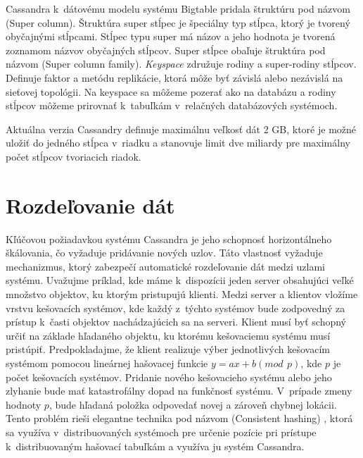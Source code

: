 \documentclass[11pt,twoside,a4paper]{book}
\begin{document}
Cassandra k~dátovému modelu systému Bigtable pridala štruktúru pod názvom \emph{} (Super column). Štruktúra super stĺpec je špeciálny typ stĺpca, ktorý je tvorený obyčajnými stĺpcami. Stĺpec typu super má názov a jeho hodnota je tvorená zoznamom názvov obyčajných stĺpcov. Super stĺpce obaľuje štruktúra pod názvom \emph{} (Super column family). \emph{Keyspace} združuje rodiny a super-rodiny stĺpcov. Definuje faktor a metódu replikácie, ktorá môže byť závislá alebo nezávislá na sieťovej topológii. Na keyspace sa môžeme pozerať ako na databázu a rodiny stĺpcov môžeme prirovnať k~tabuľkám v~relačných databázových systémoch.

Aktuálna verzia Cassandry definuje maximálnu veľkosť dát 2 GB, ktoré je možné uložiť do jedného stĺpca v~riadku a stanovuje limit dve miliardy pre maximálny počet stĺpcov tvoriacich riadok.



\section{Rozdeľovanie dát}
Kľúčovou požiadavkou systému Cassandra je jeho schopnosť horizontálneho škálovania, čo vyžaduje pridávanie nových uzlov. Táto vlastnosť vyžaduje mechanizmus, ktorý zabezpečí automatické rozdeľovanie dát medzi uzlami systému. Uvažujme príklad, kde máme k~dispozícii jeden server obsahujúci veľké množstvo objektov, ku ktorým pristupujú klienti. Medzi server a klientov vložíme vrstvu kešovacích systémov, kde každý z~týchto systémov bude zodpovedný za prístup k~časti objektov nachádzajúcich sa na serveri. Klient musí byť schopný určiť na základe hľadaného objektu, ku ktorému kešovaciemu systému musí pristúpiť. Predpokladajme, že klient realizuje výber jednotlivých kešovacím systémom pomocou lineárnej hašovacej funkcie ${y = ax + b (mod\,\ p)}$, kde $p$ je počet kešovacích systémov. Pridanie nového kešovacieho systému alebo jeho zlyhanie bude mať katastrofálny dopad na funkčnosť systému. V~prípade zmeny hodnoty $p$, bude hľadaná položka odpovedať novej a zároveň chybnej lokácii. Tento problém rieši elegantne technika pod názvom \emph{} (Consistent hashing) \cite{Karger:1997:CHR:258533.258660}, ktorá sa využíva v~distribuovaných systémoch pre určenie pozície pri prístupe k~distribuovaným hašovací tabuľkám a využíva ju systém Cassandra.
\end{document}
